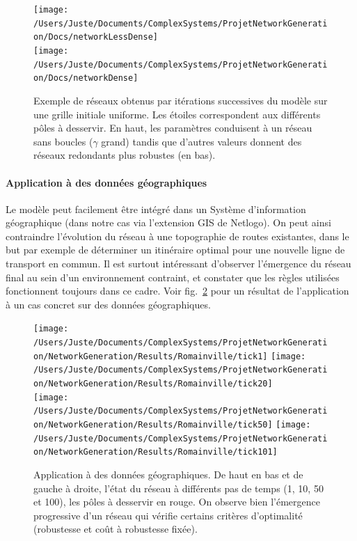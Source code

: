 \documentclass[french,12pt]{article}
\begin{document}
\begin{figure}
\centering
\texttt{[image: /Users/Juste/Documents/ComplexSystems/ProjetNetworkGeneration/Docs/networkLessDense]}\\[20pt]
\texttt{[image: /Users/Juste/Documents/ComplexSystems/ProjetNetworkGeneration/Docs/networkDense]}
\caption{\small Exemple de réseaux obtenus par itérations successives du modèle sur une grille initiale uniforme. Les étoiles correspondent aux différents pôles à desservir. En haut, les paramètres conduisent à un réseau sans boucles ($\gamma$ grand) tandis que d’autres valeurs donnent des réseaux redondants plus robustes (en bas).}
\label{fig:exNW}
\end{figure}


\paragraph{Application à des données géographiques}

Le modèle peut facilement être intégré dans un Système d’information géographique (dans notre cas via l’extension GIS de Netlogo). On peut ainsi contraindre l’évolution du réseau à une topographie de routes existantes, dans le but par exemple de déterminer un itinéraire optimal pour une nouvelle ligne de transport en commun. Il est surtout intéressant d’observer l’émergence du réseau final au sein d’un environnement contraint, et constater que les règles utilisées fonctionnent toujours dans ce cadre. Voir fig.~\ref{fig:applicationGIS} pour un résultat de l’application à un cas concret sur des données géographiques.

\begin{figure}
\centering
\texttt{[image: /Users/Juste/Documents/ComplexSystems/ProjetNetworkGeneration/NetworkGeneration/Results/Romainville/tick1]}
\texttt{[image: /Users/Juste/Documents/ComplexSystems/ProjetNetworkGeneration/NetworkGeneration/Results/Romainville/tick20]}\\
\texttt{[image: /Users/Juste/Documents/ComplexSystems/ProjetNetworkGeneration/NetworkGeneration/Results/Romainville/tick50]}
\texttt{[image: /Users/Juste/Documents/ComplexSystems/ProjetNetworkGeneration/NetworkGeneration/Results/Romainville/tick101]}
\caption{\small Application à des données géographiques. De haut en bas et de gauche à droite, l’état du réseau à différents pas de temps (1, 10, 50 et 100), les pôles à desservir en rouge. On observe bien l’émergence  progressive d’un réseau qui vérifie certains critères d’optimalité (robustesse et coût à robustesse fixée).}
\label{fig:applicationGIS}
\end{figure}
\end{document}
